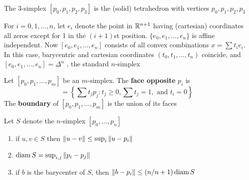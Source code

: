 \documentclass[11pt]{article}
\begin{document}
\begin{examplle}[]
The 3-simplex \([p_0,p_1,p_2,p_3]\) is the (solid) tetrahedron with vertices \(p_0,p_1,p_2,p_3\)
\end{examplle}

\begin{examplle}[]
For \(i=0,1,\dots,n\), let \(e_i\) denote the point in \(\mathbb{R}^{n+1}\) having (cartesian) coordinates all
zeros except for 1 in the \((i+1)\)st position. \(\{e_0,e_1,\dots,e_n\}\) is affine independent.
Now \([e_0,e_1,\dots,e_n]\) consists of all convex combinations \(x=\sum t_ie_i\). In this case,
barycentric and cartesian coordinates \((t_0,t_1,\dots,t_n)\) coincide, and \([e_0,e_1,\dots,e_n]=\Delta^n\) ,
the standard \(n\)-simplex
\end{examplle}

\begin{definition}[]
Let \([p_0,p_1,\dots,p_m]\) be an \(m\)-simplex. The \textbf{face opposite} \(p_i\) is
\begin{equation*}
[p_0,\dots,\hat{p}_i,\dots,p_m]=\left\{\sum t_jp_j:t_j\ge 0,\sum t_j=1,\text{ and }t_i=0
 \right\}
\end{equation*}
The \textbf{boundary} of \([p_0,p_1,\dots,p_m]\) is the union of its faces
\end{definition}

\begin{theorem}[]
Let \(S\) denote the \(n\)-simplex \([p_0,\dots,p_n]\)
\begin{enumerate}
\item if \(u,v\in S\) then \(\left\lVert u-v\right\rVert\le\sup_i\left\lVert u-p_i\right\rVert\)
\item \(\operatorname{diam} S=\sup_{i,j}\left\lVert p_i-p_j\right\rVert\)
\item if \(b\) is the barycenter of \(S\), then \(\left\lVert b-p_i\right\rVert\le(n/n+1)\operatorname{diam} S\)
\end{enumerate}
\end{theorem}
\end{document}
